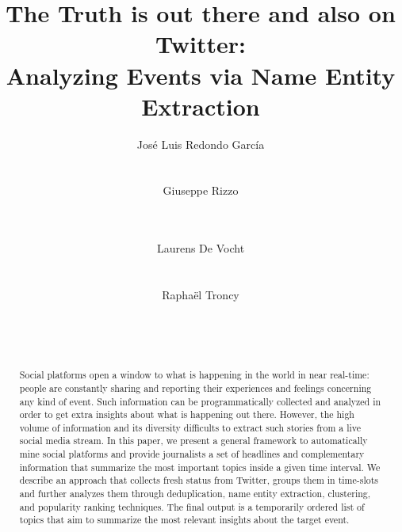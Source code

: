 \documentclass{sig-alternate}
\begin{document}
\title{The Truth is out there and also on Twitter: \\ Analyzing Events via Name Entity Extraction}

\author{
\alignauthor Jos\'e Luis Redondo Garc\'ia\\
	\\
	\\
\alignauthor Giuseppe Rizzo\\
	\\
	\\
\and
\alignauthor Laurens De Vocht\\
    \\
    \\
\alignauthor Rapha\"el Troncy\\
	\\
	\\
		\\
}

\maketitle


\begin{abstract}

Social platforms open a window to what is happening in the world in near real-time: people are constantly sharing and reporting their experiences and feelings concerning any kind of event. Such information can be programmatically collected and analyzed in order to get extra insights about what is happening out there. However, the high volume of information and its diversity difficults to extract such stories from a live social media stream. In this paper, we present a general framework to automatically mine social platforms and provide journalists a set of headlines and complementary information that summarize the most important topics inside a given time interval. We describe an approach that collects fresh status from Twitter, groups them in time-slots and further analyzes them through deduplication, name entity extraction, clustering, and popularity ranking techniques. The final output is a temporarily ordered list of topics that aim to summarize the most relevant insights about the target event. 

\end{abstract}
\end{document}
